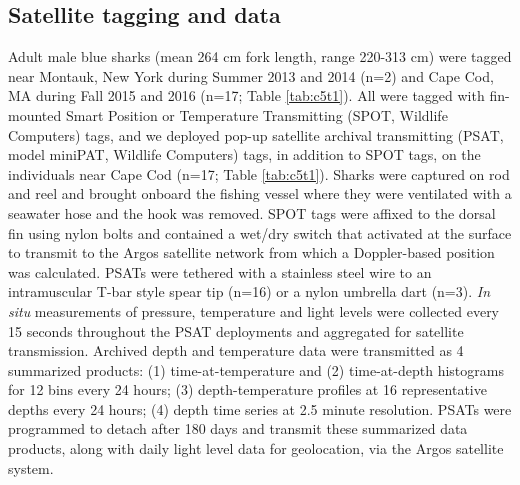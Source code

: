 \subsection{Satellite tagging and data} \label{sec:satdata}

Adult male blue sharks (mean 264 cm fork length, range 220-313 cm) were tagged near Montauk, New York during Summer 2013 and 2014 (n=2) and Cape Cod, MA during Fall 2015 and 2016 (n=17; Table \cref{tab:c5t1}). All were tagged with fin-mounted Smart Position or Temperature Transmitting (SPOT, Wildlife Computers) tags, and we deployed pop-up satellite archival transmitting (PSAT, model miniPAT, Wildlife Computers) tags, in addition to SPOT tags, on the individuals near Cape Cod (n=17; Table \cref{tab:c5t1}). Sharks were captured on rod and reel and brought onboard the fishing vessel where they were ventilated with a seawater hose and the hook was removed. SPOT tags were affixed to the dorsal fin using nylon bolts and contained a wet/dry switch that activated at the surface to transmit to the Argos satellite network from which a Doppler-based position was calculated. PSATs were tethered with a stainless steel wire to an intramuscular T-bar style spear tip (n=16) or a nylon umbrella dart (n=3). \textit{In situ} measurements of pressure, temperature and light levels were collected every 15 seconds throughout the PSAT deployments and aggregated for satellite transmission. Archived depth and temperature data were transmitted as 4 summarized products: (1) time-at-temperature and (2) time-at-depth histograms for 12 bins every 24 hours; (3) depth-temperature profiles at 16 representative depths every 24 hours; (4) depth time series at 2.5 minute resolution. PSATs were programmed to detach after 180 days and transmit these summarized data products, along with daily light level data for geolocation, via the Argos satellite system.

